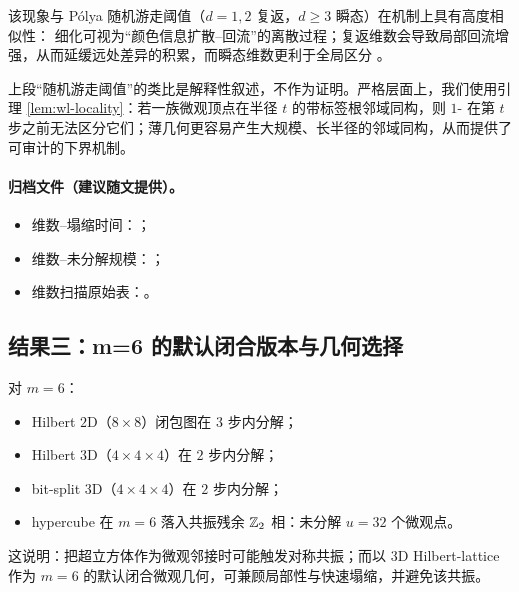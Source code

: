 该现象与 P{\'o}lya 随机游走阈值（$d=1,2$ 复返，$d\ge 3$ 瞬态）在机制上具有高度相似性：\WL{} 细化可视为“颜色信息扩散--回流”的离散过程；复返维数会导致局部回流增强，从而延缓远处差异的积累，而瞬态维数更利于全局区分 \cite{novakpolya}。
\begin{remark}
上段“随机游走阈值”的类比是解释性叙述，不作为证明。严格层面上，我们使用引理 \ref{lem:wl-locality}：若一族微观顶点在半径 $t$ 的带标签根邻域同构，则 $1$-\WL{} 在第 $t$ 步之前无法区分它们；薄几何更容易产生大规模、长半径的邻域同构，从而提供了可审计的下界机制。
\end{remark}

\paragraph{归档文件（建议随文提供）。}
\begin{itemize}
  \item 维数--塌缩时间：；
  \item 维数--未分解规模：；
  \item 维数扫描原始表：。
\end{itemize}



\begin{center}

\end{center}

\subsection{结果三：m=6 的默认闭合版本与几何选择}

对 $m=6$：
\begin{itemize}
  \item Hilbert $2$D（$8\times 8$）闭包图在 $3$ 步内分解；
  \item Hilbert $3$D（$4\times 4\times 4$）在 $2$ 步内分解；
  \item bit-split $3$D（$4\times 4\times 4$）在 $2$ 步内分解；
  \item hypercube 在 $m=6$ 落入共振残余 $\mathbb{Z}_2$ 相：未分解 $u=32$ 个微观点。
\end{itemize}
这说明：把超立方体作为微观邻接时可能触发对称共振；而以 $3$D Hilbert-lattice 作为 $m=6$ 的默认闭合微观几何，可兼顾局部性与快速塌缩，并避免该共振。

